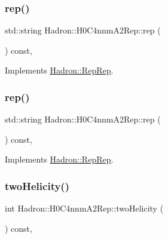 \subsubsection{\texorpdfstring{rep()}{rep()}\hspace{0.1cm}{\footnotesize\ttfamily [4/5]}}
{\footnotesize\ttfamily std\+::string Hadron\+::\+H0\+C4nnm\+A2\+Rep\+::rep (\begin{DoxyParamCaption}{ }\end{DoxyParamCaption}) const\hspace{0.3cm}{\ttfamily [inline]}, {\ttfamily [virtual]}}



Implements \mbox{\hyperlink{structHadron_1_1RepRep_ab3213025f6de249f7095892109575fde}{Hadron\+::\+Rep\+Rep}}.

\mbox{\label{structHadron_1_1H0C4nnmA2Rep_a7d5e9bf3b8a6abda949a015707a87dff}} 
\subsubsection{\texorpdfstring{rep()}{rep()}\hspace{0.1cm}{\footnotesize\ttfamily [5/5]}}
{\footnotesize\ttfamily std\+::string Hadron\+::\+H0\+C4nnm\+A2\+Rep\+::rep (\begin{DoxyParamCaption}{ }\end{DoxyParamCaption}) const\hspace{0.3cm}{\ttfamily [inline]}, {\ttfamily [virtual]}}



Implements \mbox{\hyperlink{structHadron_1_1RepRep_ab3213025f6de249f7095892109575fde}{Hadron\+::\+Rep\+Rep}}.

\mbox{\label{structHadron_1_1H0C4nnmA2Rep_a397249fde56ef379e5651fa31203da8c}} 
\subsubsection{\texorpdfstring{twoHelicity()}{twoHelicity()}\hspace{0.1cm}{\footnotesize\ttfamily [1/3]}}
{\footnotesize\ttfamily int Hadron\+::\+H0\+C4nnm\+A2\+Rep\+::two\+Helicity (\begin{DoxyParamCaption}{ }\end{DoxyParamCaption}) const\hspace{0.3cm}{\ttfamily [inline]}, {\ttfamily [virtual]}}

